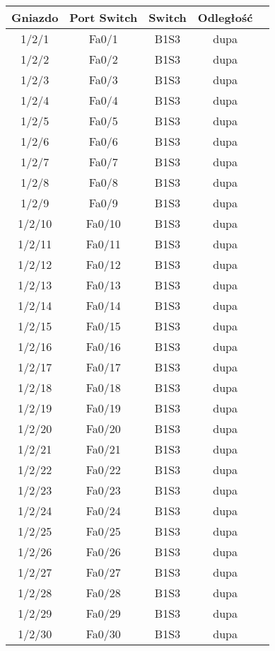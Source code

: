 \begin{center}
    \begin{longtable}{|c|c|c|c|c|}
    \hline
    Gniazdo & Port Switch & Switch & Odległość \\ \hline
	1/2/1 & Fa0/1 & B1S3 & dupa \\ \hline
	1/2/2 & Fa0/2 & B1S3 & dupa \\ \hline
	1/2/3 & Fa0/3 & B1S3 & dupa \\ \hline
	1/2/4 & Fa0/4 & B1S3 & dupa \\ \hline
	1/2/5 & Fa0/5 & B1S3 & dupa \\ \hline
	1/2/6 & Fa0/6 & B1S3 & dupa \\ \hline
	1/2/7 & Fa0/7 & B1S3 & dupa \\ \hline
	1/2/8 & Fa0/8 & B1S3 & dupa \\ \hline
	1/2/9 & Fa0/9 & B1S3 & dupa \\ \hline
	1/2/10 & Fa0/10 & B1S3 & dupa \\ \hline
	1/2/11 & Fa0/11 & B1S3 & dupa \\ \hline
	1/2/12 & Fa0/12 & B1S3 & dupa \\ \hline
	1/2/13 & Fa0/13 & B1S3 & dupa \\ \hline
	1/2/14 & Fa0/14 & B1S3 & dupa \\ \hline
	1/2/15 & Fa0/15 & B1S3 & dupa \\ \hline
	1/2/16 & Fa0/16 & B1S3 & dupa \\ \hline
	1/2/17 & Fa0/17 & B1S3 & dupa \\ \hline
	1/2/18 & Fa0/18 & B1S3 & dupa \\ \hline
	1/2/19 & Fa0/19 & B1S3 & dupa \\ \hline
	1/2/20 & Fa0/20 & B1S3 & dupa \\ \hline
	1/2/21 & Fa0/21 & B1S3 & dupa \\ \hline
	1/2/22 & Fa0/22 & B1S3 & dupa \\ \hline
	1/2/23 & Fa0/23 & B1S3 & dupa \\ \hline
	1/2/24 & Fa0/24 & B1S3 & dupa \\ \hline
	1/2/25 & Fa0/25 & B1S3 & dupa \\ \hline
	1/2/26 & Fa0/26 & B1S3 & dupa \\ \hline
	1/2/27 & Fa0/27 & B1S3 & dupa \\ \hline
	1/2/28 & Fa0/28 & B1S3 & dupa \\ \hline
	1/2/29 & Fa0/29 & B1S3 & dupa \\ \hline
	1/2/30 & Fa0/30 & B1S3 & dupa \\ \hline

\end{longtable}
\end{center}
